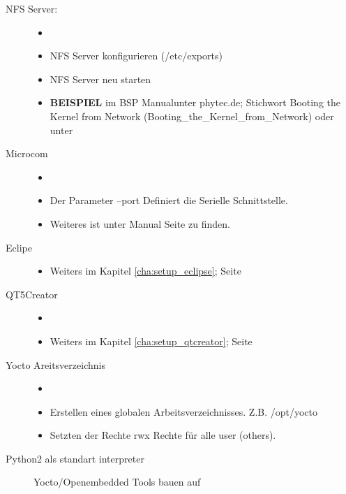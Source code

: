 \begin{description}
    \item[NFS Server:]
        \begin{itemize}
            \item[ ]
            \item NFS Server konfigurieren (/etc/exports)
            \item NFS Server neu starten
            \item \textbf{BEISPIEL} im \glqq BSP Manual\grqq unter  phytec.de;
                    Stichwort \glqq Booting the Kernel from Network\grqq
                (Booting\_the\_Kernel\_from\_Network) \cite{Pytec:BSP_Manual}
                oder unter \cite[S.
                45]{Gonzalez2018:Embedded_Linux_Development_Using_Yocto_Project_Cookbook_2nd}
        \end{itemize}
    \item[Microcom]
        \begin{itemize}
            \item[ ]
            \item Der Parameter --port Definiert die Serielle Schnittstelle.
            \item Weiteres ist unter Manual Seite zu finden.
        \end{itemize}
    \item[Eclipe]
        \begin{itemize}
            \item Weiters im Kapitel \ref{cha:setup_eclipse}; Seite
                \pageref{cha:setup_eclipse}
        \end{itemize}
    \item[QT5Creator]
        \begin{itemize}
            \item[ ]
            \item Weiters im Kapitel \ref{cha:setup_qtcreator}; Seite
                \pageref{cha:setup_qtcreator}
        \end{itemize}
    \item[Yocto Areitsverzeichnis]
        \begin{itemize}
            \item[ ]
            \item Erstellen eines globalen Arbeitsverzeichnisses.  Z.B.
                /opt/yocto \item Setzten der Rechte rwx Rechte für alle user
                (\glqq others\grqq).
        \end{itemize}
    \item[Python2 als standart interpreter] Yocto/Openembedded Tools bauen auf

\end{description}
